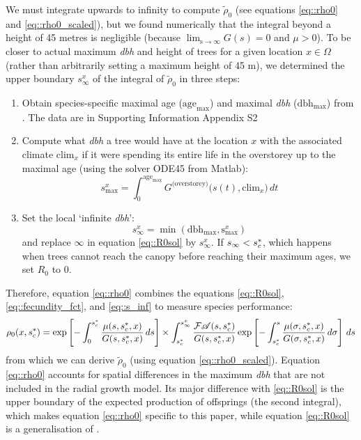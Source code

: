 We must integrate upwards to infinity to compute $ \tilde \rho_0 $ (see equations \eqref{eq::rho0} and \eqref{eq::rho0_scaled}), but we found numerically that the integral beyond a height of 45 metres is negligible (because $ \lim_{\text{s} \to \infty} G(s) = 0 $ and $ \mu > 0 $). To be closer to actual maximum \textit{dbh} and height of trees for a given location $ x \in \Omega $ (rather than arbitrarily setting a maximum height of 45 m), we determined the upper boundary $ s_{\infty}^{x} $ of the integral of $ \tilde \rho_0 $ in three steps:
\begin{enumerate}
	\item Obtain species-specific maximal age ($ \text{age}_{\max} $) and maximal \textit{dbh} ($ \text{dbh}_{\max} $) from \citet{Burns1990, Burns1990a}. The data are in Supporting Information Appendix S2
	\item Compute what \textit{dbh} a tree would have at the location $ x $ with the associated climate $ \text{clim}_x $ if it were spending its entire life in the overstorey up to the maximal age (using the solver ODE45 from Matlab):
	\[
		s_{\max}^{x} = \int_0^{\text{age}_{\max}} G^{\text{(overstorey)}}\big(s(t), \text{clim}_x \big) \, dt
	\]
	\item Set the local `infinite \textit{dbh}':
	\begin{equation} \label{eq::s_inf}
		s_{\infty}^{x} = \min(\text{dbh}_{\max}, \text{s}_{\max}^{x})
	\end{equation}
	and replace $ \infty $ in equation \eqref{eq::R0sol} by $ s_{\infty}^{x} $. If $ s_{\infty} < {s}^{*}_c $, which happens when trees cannot reach the canopy before reaching their maximum ages, we set $ R_0 $ to 0.
\end{enumerate}

Therefore, equation \eqref{eq::rho0} combines the equations \eqref{eq::R0sol}, \eqref{eq::fecundity_fct}, and \eqref{eq::s_inf} to measure species performance:
\begin{equation} \label{eq::rho0}
	\rho_0(x, {s}^{*}_c) = \exp \left[-\int_0^{{s}^{*}_c}\frac{\mu(s, {s}^{*}_c, x)}{G(s, {s}^{*}_c, x)} \, ds \right] \times \int_{{s}^{*}_c}^{s_{\infty}^{x}} \frac{\mathcal{F} \mathscr{A}(s, {s}^{*}_c)}{G(s, {s}^{*}_c, x)} \exp \left[-\int_{{s}^{*}_c}^{s} \frac{\mu(\sigma, {s}^{*}_c, x)}{G(\sigma, {s}^{*}_c, x)} \, d\sigma \right] \, ds
\end{equation}
from which we can derive $ \tilde \rho_0 $ (using equation \eqref{eq::rho0_scaled}). Equation \eqref{eq::rho0} accounts for spatial differences in the maximum \textit{dbh} that are not included in the radial growth model. Its major difference with \eqref{eq::R0sol} is the upper boundary of the expected production of offsprings (the second integral), which makes equation \eqref{eq::rho0} specific to this paper, while equation \eqref{eq::R0sol} is a generalisation of \citet{Purves2009}.


